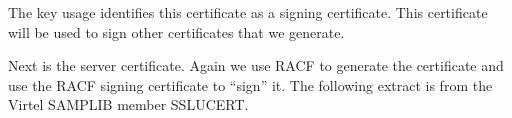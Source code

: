 \documentclass[letterpaper,10pt,english]{sphinxmanual}
\begin{document}
The key usage identifies this certificate as a signing certificate. This certificate will be used to sign other certificates
that we generate.

Next is the server certificate. Again we use RACF to generate the certificate and use the RACF signing certificate to
“sign” it. The following extract is from the Virtel SAMPLIB member SSLUCERT.

\begin{sphinxVerbatim}[commandchars=\\\{\}]
  
  
  
     

\end{sphinxVerbatim}
\end{document}
